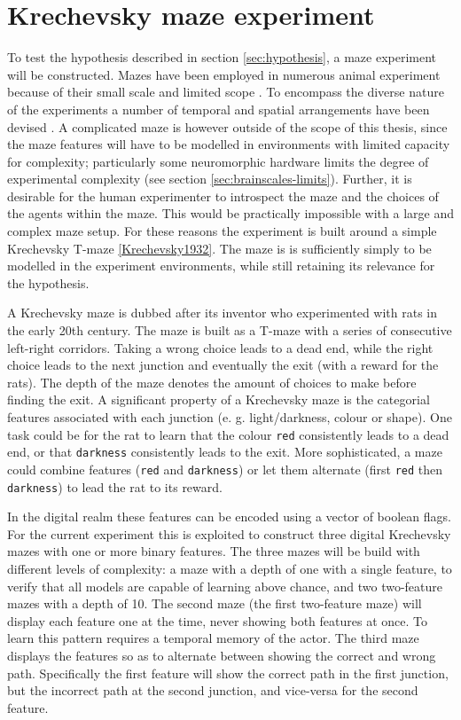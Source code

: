 \documentclass[report.tex]{subfiles}
\begin{document}
\section{Krechevsky maze experiment}
To test the hypothesis described in section \ref{sec:hypothesis}, a maze experiment will be constructed.
Mazes have been employed in numerous animal experiment because of their small scale and limited scope \autocite{Krechevsky1932,Tolman1927}.
To encompass the diverse nature of the experiments a number of temporal and spatial arrangements have been devised \autocite{Tolman1927}.
A complicated maze is however outside of the scope of this thesis, since the maze features will have to be modelled in environments with limited capacity for complexity; particularly some neuromorphic hardware limits the degree of experimental complexity (see section \ref{sec:brainscales-limits}).
Further, it is desirable for the human experimenter to introspect the maze and the choices of the agents within the maze.
This would be practically impossible with a large and complex maze setup.
For these reasons the experiment is built around a simple Krechevsky T-maze \ref{Krechevsky1932}.
The maze is is sufficiently simply to be modelled in the experiment environments, while still retaining its relevance for the hypothesis.

A Krechevsky maze is dubbed after its inventor who experimented with rats in the early 20th century.
The maze is built as a T-maze with a series of consecutive left-right corridors.
Taking a wrong choice leads to a dead end, while the right choice leads to the next junction and eventually the exit (with a reward for the rats).
The depth of the maze denotes the amount of choices to make before finding the exit.
A significant property of a Krechevsky maze is the categorial features associated with each junction (e. g. light/darkness, colour or shape).
One task could be for the rat to learn that the colour \texttt{red} consistently leads to a dead end, or that \texttt{darkness} consistently leads to the exit.
More sophisticated, a maze could combine features (\texttt{red} and \texttt{darkness}) or let them alternate (first \texttt{red} then \texttt{darkness}) to lead the rat to its reward.

In the digital realm these features can be encoded using a vector of boolean flags.
For the current experiment this is exploited to construct three digital Krechevsky mazes with one or more binary features.
The three mazes will be build with different levels of complexity: a maze with a depth of one with a single feature, to verify that all models are capable of learning above chance, and two two-feature mazes with a depth of 10.
The second maze (the first two-feature maze) will display each feature one at the time, never showing both features at once.
To learn this pattern requires a temporal memory of the actor.
The third maze displays the features so as to alternate between showing the correct and wrong path.
Specifically the first feature will show the correct path in the first junction, but the incorrect path at the second junction, and vice-versa for the second feature.
\end{document}
